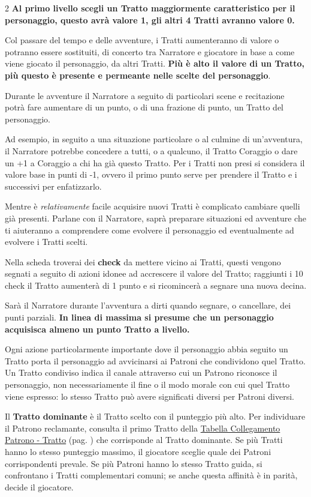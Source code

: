 \begin{multicols}{2}
\textbf{Al primo livello scegli un Tratto maggiormente caratteristico per il personaggio, questo avrà valore 1, gli altri 4 Tratti avranno valore 0.}

Col passare del tempo e delle avventure, i Tratti aumenteranno di valore o potranno essere sostituiti, di concerto tra Narratore e giocatore in base a come viene giocato il personaggio, da altri Tratti. \textbf{Più è alto il valore di un Tratto, più questo è presente e permeante nelle scelte del personaggio}.

Durante le avventure il Narratore a seguito di particolari scene e recitazione potrà fare aumentare di un punto, o di una frazione di punto, un Tratto del personaggio.

Ad esempio, in seguito a una situazione particolare o al culmine di un'avventura, il Narratore potrebbe concedere a tutti, o a qualcuno, il Tratto Coraggio o dare un +1 a Coraggio a chi ha già questo Tratto. Per i Tratti non presi si considera il valore base in punti di -1, ovvero il primo punto serve per prendere il Tratto e i successivi per enfatizzarlo.

Mentre è \emph{relativamente} facile acquisire nuovi Tratti è complicato cambiare quelli già presenti. Parlane con il Narratore, saprà preparare situazioni ed avventure che ti aiuteranno a comprendere come evolvere il personaggio ed eventualmente ad evolvere i Tratti scelti.

Nella scheda troverai dei \textbf{check} da mettere vicino ai Tratti, questi vengono segnati a seguito di azioni idonee ad accrescere il valore del Tratto; raggiunti i 10 check il Tratto aumenterà di 1 punto e si ricomincerà a segnare una nuova decina.

Sarà il Narratore durante l'avventura a dirti quando segnare, o cancellare, dei punti parziali. \textbf{In linea di massima si presume che un personaggio acquisisca almeno un punto Tratto a livello.}

Ogni azione particolarmente importante dove il personaggio abbia seguito un Tratto porta il personaggio ad avvicinarsi ai Patroni che condividono quel Tratto. Un Tratto condiviso indica il canale attraverso cui un Patrono riconosce il personaggio, non necessariamente il fine o il modo morale con cui quel Tratto viene espresso: lo stesso Tratto può avere significati diversi per Patroni diversi.

Il \textbf{Tratto dominante} è il Tratto scelto con il punteggio più alto. Per individuare il Patrono reclamante, consulta il primo Tratto della \hyperlink{tabellacollegamentopatronotratto}{Tabella Collegamento Patrono - Tratto} (pag. \pageref{tabellacollegamentopatronotratto}) che corrisponde al Tratto dominante. Se più Tratti hanno lo stesso punteggio massimo, il giocatore sceglie quale dei Patroni corrispondenti prevale. Se più Patroni hanno lo stesso Tratto guida, si confrontano i Tratti complementari comuni; se anche questa affinità è in parità, decide il giocatore.


\end{multicols}
